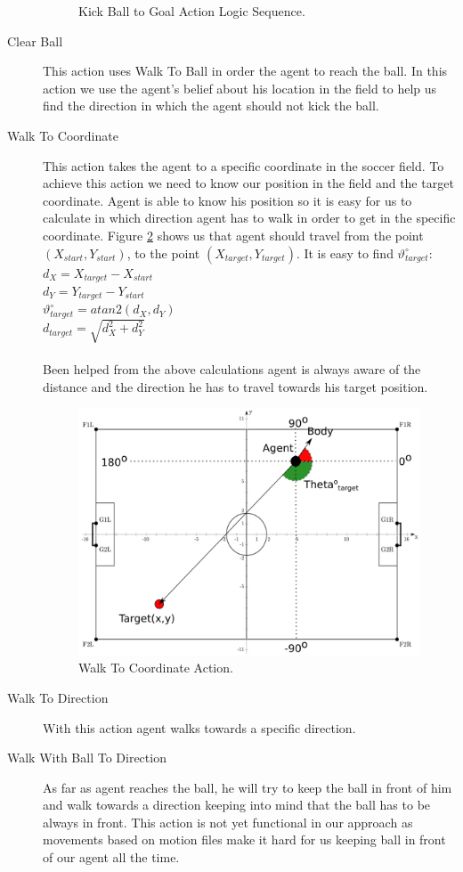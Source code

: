 \begin{description}
\begin{figure}[!h]
  \caption{Kick Ball to Goal Action Logic Sequence.}
  \label{fig:GoKickBallToGoal}
\end{figure}
 \item[Clear Ball] This action uses Walk To Ball in order the agent to reach the ball. In this action we use the agent's belief about his location in the field to help us find the direction in which the agent should not kick the ball.
 \item[Walk To Coordinate]
 This action takes the agent to a specific coordinate in the soccer field. To achieve this action we need to know our position in the field and the target coordinate. Agent is able to know his position so it is easy for us to calculate in which direction agent has to walk in order to get in the specific coordinate. Figure \ref{fig:WalkToCoordinate} shows us that agent should travel from the point $(X_{start},Y_{start})$, to the point $(X_{target},Y_{target})$. It is easy to find $\vartheta_{target}^{\circ}$:\\
$d_{X} = X_{target} - X_{start}$\\
$d_{Y} = Y_{target} - Y_{start}$\\
$\vartheta_{target}^{\circ} = atan2(d_{X},d_{Y})$\\
$d_{target} = \sqrt{d_{X}^2 + d_{Y}^2}$\\
\\
Been helped from the above calculations agent is always aware of the distance and the direction he has to travel towards his target position. 
 \begin{figure}[!h]
\centering
  \includegraphics[scale=0.6]{Chapter3/figures/GoToPos.pdf}
  \caption{Walk To Coordinate Action.}
  \label{fig:WalkToCoordinate}
\end{figure}
 \item[Walk To Direction]
 With this action agent walks towards a specific direction.
 \item[Walk With Ball To Direction]
 As far as agent reaches the ball, he will try to keep the ball in front of him and walk towards a direction keeping into mind that the ball has to be always in front. This action is not yet functional in our approach as movements based on motion files make it hard for us keeping ball in front of our agent all the time.
\end{description}


